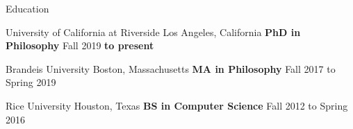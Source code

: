 \documentclass{resume}
\newcommand{\ToPresent}[0]{\textbf{to present}}
\newcommand{\maru}[0]{Maru{\v s}i{\' c}}
\newcommand{\beri}[0]{Berislav \maru}
\newcommand{\jen}[0]{Jennifer \maru}
\begin{document}
\begin{rSection}{Education}

  \EventWithSubtitle
  {\normalfont University of California at Riverside}
  {Los Angeles, California}
  {\bf PhD in Philosophy}
  {Fall 2019 \ToPresent}%

    \iftoggle{cv}{
    \begin{rSubSection}
  }{\EventWithSubtitle}
    {\normalfont Brandeis University}
    {Boston, Massachusetts}
    {\bf MA in Philosophy}
    {Fall 2017 to Spring 2019}%
    \iftoggle{cv}{
      \item Thesis:~``Reasoning [\&] Rationality''
      \item Advisors:~Eli Hirsch, \beri, \& \jen
    }{}%
    \iftoggle{cv}{
    \end{rSubSection}}{}

    \EventWithSubtitle
  {\normalfont Rice University}
  {Houston, Texas}
  {\bf BS in Computer Science}
  {Fall 2012 to Spring 2016}%


\end{rSection}
\end{document}
